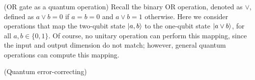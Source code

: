 \begin{questions}
  \question[15] (OR gate as a quantum operation) Recall the binary OR
  operation, denoted as $\vee$, defined as $a \vee b = 0$ if
  $a = b = 0$ and $a\vee b = 1$ otherwise. Here we consider operations
  that map the two-qubit state $\lvert a, b \rangle$ to the one-qubit state
  $\lvert a\vee b \rangle$, for all $a,b \in \{0,1\}$. Of course, no unitary
  operation can perform this mapping, since the input and output
  dimension do not match; however, general quantum operations can
  compute this mapping.

  
  
  \question (Quantum error-correcting) 
  \begin{parts}

\end{parts}
\end{questions}

